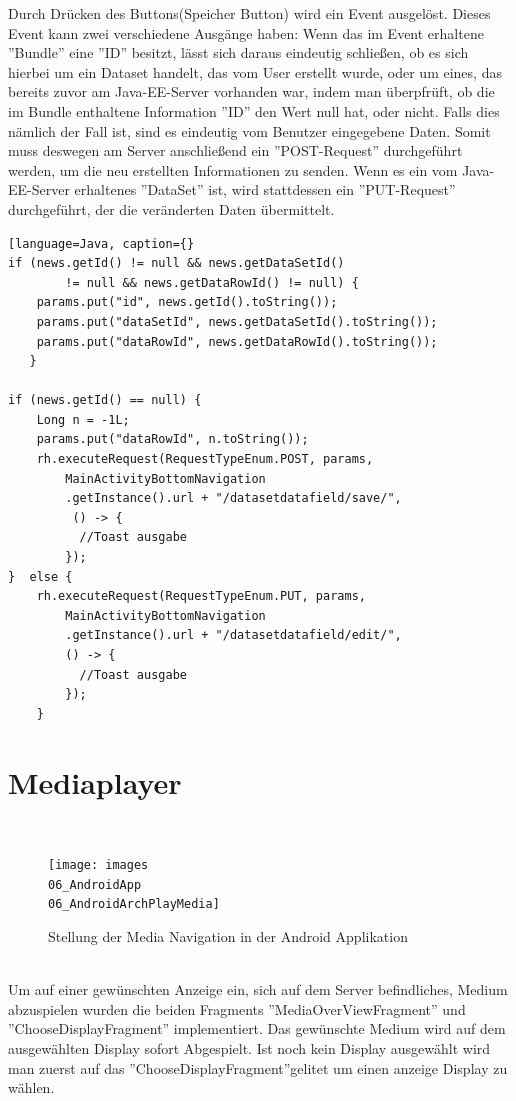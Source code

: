Durch Drücken des Buttons(Speicher Button) wird ein Event ausgelöst. Dieses Event kann zwei verschiedene Ausgänge haben: Wenn das im Event erhaltene ''Bundle'' eine ''ID'' besitzt, lässt sich daraus eindeutig schließen, ob es sich hierbei um ein Dataset handelt, das vom User erstellt wurde, oder um eines, das bereits zuvor am Java-EE-Server vorhanden war, indem man überpfrüft, ob die im Bundle enthaltene Information ''ID'' den Wert null hat, oder nicht. Falls dies nämlich der Fall ist, sind es eindeutig vom Benutzer eingegebene Daten. Somit muss deswegen am Server anschließend ein ''POST-Request'' durchgeführt werden, um die neu erstellten Informationen zu senden.
Wenn es ein vom Java-EE-Server erhaltenes ''DataSet'' ist, wird stattdessen ein ''PUT-Request'' durchgeführt, der die veränderten Daten übermittelt. 
\begin{lstlisting}[language=Java, caption={}
if (news.getId() != null && news.getDataSetId() 
		!= null && news.getDataRowId() != null) {
	params.put("id", news.getId().toString());
    params.put("dataSetId", news.getDataSetId().toString());
    params.put("dataRowId", news.getDataRowId().toString());
   } 
       
if (news.getId() == null) {
    Long n = -1L;
    params.put("dataRowId", n.toString());
    rh.executeRequest(RequestTypeEnum.POST, params,
       	MainActivityBottomNavigation
        .getInstance().url + "/datasetdatafield/save/",
         () -> {
          //Toast ausgabe
        });
}  else {
    rh.executeRequest(RequestTypeEnum.PUT, params,
        MainActivityBottomNavigation
        .getInstance().url + "/datasetdatafield/edit/",
       	() -> { 
          //Toast ausgabe
        });                 
    }
\end{lstlisting} 
\section{Mediaplayer}
\\
\begin{figure}[H]
\centering
\texttt{[image: images\\06\_AndroidApp\\06\_AndroidArchPlayMedia]}
\caption{Stellung der Media Navigation in der Android Applikation}
\label{fig:mediaNav}
\end{figure}
\\
Um auf einer gewünschten Anzeige ein, sich auf dem Server befindliches, Medium abzuspielen wurden die beiden Fragments ''MediaOverViewFragment'' und ''ChooseDisplayFragment'' implementiert. Das gewünschte Medium wird auf dem ausgewählten Display sofort Abgespielt. Ist noch kein Display ausgewählt wird man zuerst auf das ''ChooseDisplayFragment''gelitet um einen anzeige Display zu wählen.

